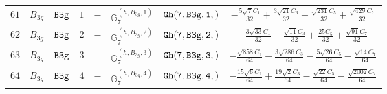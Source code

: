 \documentclass[fleqn,8pt]{jsarticle}
\begin{document}
\begin{table}[ht!]
\begin{center}
\begin{tabular}{cccccccc}
$ 61 $ & $ B_{3g} $ & $ {\tt B3g} $ & $ 1 $ & $ - $ & $ \mathbb{G}_{7}^{(h,B_{3g},1)} $ & $ {\tt Gh(7,B3g,1,)} $ & $ - \frac{5 \sqrt{7} C_{1}}{32} + \frac{3 \sqrt{21} C_{3}}{32} - \frac{\sqrt{231} C_{5}}{32} + \frac{\sqrt{429} C_{7}}{32} $ \\
$ 62 $ & $ B_{3g} $ & $ {\tt B3g} $ & $ 2 $ & $ - $ & $ \mathbb{G}_{7}^{(h,B_{3g},2)} $ & $ {\tt Gh(7,B3g,2,)} $ & $ - \frac{3 \sqrt{33} C_{1}}{32} - \frac{\sqrt{11} C_{3}}{32} + \frac{25 C_{5}}{32} + \frac{\sqrt{91} C_{7}}{32} $ \\
$ 63 $ & $ B_{3g} $ & $ {\tt B3g} $ & $ 3 $ & $ - $ & $ \mathbb{G}_{7}^{(h,B_{3g},3)} $ & $ {\tt Gh(7,B3g,3,)} $ & $ - \frac{\sqrt{858} C_{1}}{64} - \frac{3 \sqrt{286} C_{3}}{64} - \frac{5 \sqrt{26} C_{5}}{64} - \frac{\sqrt{14} C_{7}}{64} $ \\
$ 64 $ & $ B_{3g} $ & $ {\tt B3g} $ & $ 4 $ & $ - $ & $ \mathbb{G}_{7}^{(h,B_{3g},4)} $ & $ {\tt Gh(7,B3g,4,)} $ & $ - \frac{15 \sqrt{6} C_{1}}{64} + \frac{19 \sqrt{2} C_{3}}{64} - \frac{\sqrt{22} C_{5}}{64} - \frac{\sqrt{2002} C_{7}}{64} $ \\
 \hline \hline
\end{tabular}
\end{center}
\end{table}
\end{document}
